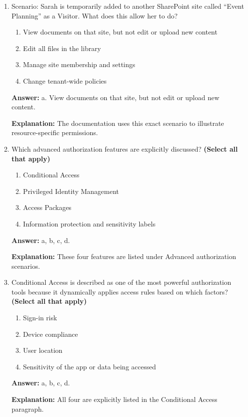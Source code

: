 \documentclass[10pt]{article}
\begin{document}
\begin{enumerate}[leftmargin=*]
\textbf{Explanation:} This is the exact example used in the documentation.

\item Scenario: Sarah is temporarily added to another SharePoint site called ``Event Planning'' as a Visitor. What does this allow her to do?
\begin{enumerate}[label=\alph*., leftmargin=1.5em]
\item View documents on that site, but not edit or upload new content
\item Edit all files in the library
\item Manage site membership and settings
\item Change tenant-wide policies
\end{enumerate}
\textbf{Answer:} a. View documents on that site, but not edit or upload new content.

\textbf{Explanation:} The documentation uses this exact scenario to illustrate resource-specific permissions.

\item Which advanced authorization features are explicitly discussed? \textbf{(Select all that apply)}
\begin{enumerate}[label=\alph*., leftmargin=1.5em]
\item Conditional Access
\item Privileged Identity Management
\item Access Packages
\item Information protection and sensitivity labels
\end{enumerate}
\textbf{Answer:} a, b, c, d.

\textbf{Explanation:} These four features are listed under Advanced authorization scenarios.

\item Conditional Access is described as one of the most powerful authorization tools because it dynamically applies access rules based on which factors? \textbf{(Select all that apply)}
\begin{enumerate}[label=\alph*., leftmargin=1.5em]
\item Sign-in risk
\item Device compliance
\item User location
\item Sensitivity of the app or data being accessed
\end{enumerate}
\textbf{Answer:} a, b, c, d.

\textbf{Explanation:} All four are explicitly listed in the Conditional Access paragraph.


\end{enumerate}
\end{document}
